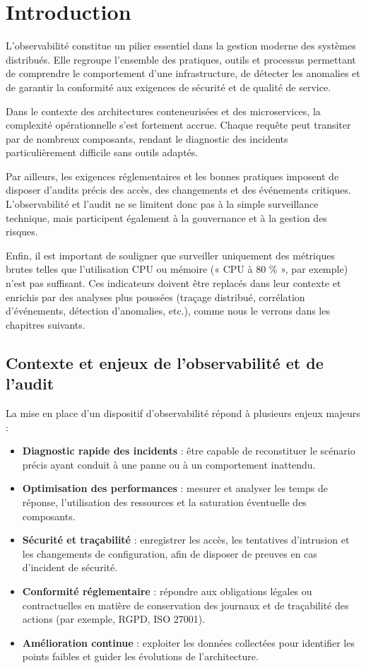 \section{Introduction}

L’observabilité constitue un pilier essentiel dans la gestion moderne des systèmes distribués. Elle regroupe l’ensemble des pratiques, outils et processus permettant de comprendre le comportement d’une infrastructure, de détecter les anomalies et de garantir la conformité aux exigences de sécurité et de qualité de service.

Dans le contexte des architectures conteneurisées et des microservices, la complexité opérationnelle s’est fortement accrue. Chaque requête peut transiter par de nombreux composants, rendant le diagnostic des incidents particulièrement difficile sans outils adaptés.

Par ailleurs, les exigences réglementaires et les bonnes pratiques imposent de disposer d’audits précis des accès, des changements et des événements critiques. L’observabilité et l’audit ne se limitent donc pas à la simple surveillance technique, mais participent également à la gouvernance et à la gestion des risques.

Enfin, il est important de souligner que surveiller uniquement des métriques brutes telles que l’utilisation CPU ou mémoire (« CPU à 80 \% », par exemple) n’est pas suffisant. Ces indicateurs doivent être replacés dans leur contexte et enrichis par des analyses plus poussées (traçage distribué, corrélation d’événements, détection d’anomalies, etc.), comme nous le verrons dans les chapitres suivants.

\subsection{Contexte et enjeux de l'observabilité et de l'audit}

La mise en place d’un dispositif d’observabilité répond à plusieurs enjeux majeurs :

\begin{itemize}
	\item \textbf{Diagnostic rapide des incidents} : être capable de reconstituer le scénario précis ayant conduit à une panne ou à un comportement inattendu.
	\item \textbf{Optimisation des performances} : mesurer et analyser les temps de réponse, l’utilisation des ressources et la saturation éventuelle des composants.
	\item \textbf{Sécurité et traçabilité} : enregistrer les accès, les tentatives d’intrusion et les changements de configuration, afin de disposer de preuves en cas d’incident de sécurité.
	\item \textbf{Conformité réglementaire} : répondre aux obligations légales ou contractuelles en matière de conservation des journaux et de traçabilité des actions (par exemple, RGPD, ISO 27001).
	\item \textbf{Amélioration continue} : exploiter les données collectées pour identifier les points faibles et guider les évolutions de l’architecture.
\end{itemize}

